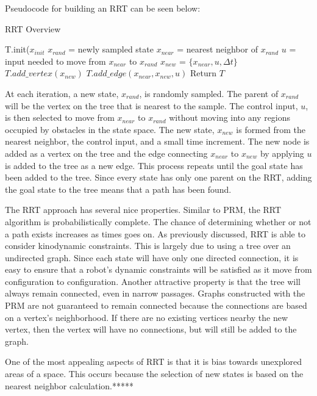 \documentclass[10pt,conference]{ieeeconf}
\begin{document}
Pseudocode for building an RRT can be seen below:

\begin{algorithm}
\caption{RRT Overview}
\begin{algorithmic}[1]
\State T.init($x_{init}$
\State $x_{rand}$ = newly sampled state
\State $x_{near}$ = nearest neighbor of $x_{rand}$
\State $u$ = input needed to move from $x_{near}$ to $x_{rand}$
\State $x_{new}$ = $\{x_{near}, u, \Delta t\}$
\State $T.add\_vertex(x_{new})$
\State $T.add\_edge(x_{near}, x_{new}, u)$
\EndWhile
\State Return $T$
\EndFunction
\end{algorithmic}
\end{algorithm}

At each iteration, a new state, $x_{rand}$, is randomly sampled. The parent of $x_{rand}$ will be the vertex on the tree that is nearest to the sample. The control input, $u$, is then selected to move from $x_{near}$ to $x_{rand}$ without moving into any regions occupied by obstacles in the state space. The new state, $x_{new}$ is formed from the nearest neighbor, the control input, and a small time increment. The new node is added as a vertex on the tree and the edge connecting $x_{near}$ to $x_{new}$ by applying $u$ is added to the tree as a new edge. This process repeats until the goal state has been added to the tree. Since every state has only one parent on the RRT, adding the goal state to the tree means that a path has been found. 

The RRT approach has several nice properties. Similar to PRM, the RRT algorithm is probabilistically complete. The chance of determining whether or not a path exists increases as times goes on. As previously discussed, RRT is able to consider kinodynamic constraints. This is largely due to using a tree over an undirected graph. Since each state will have only one directed connection, it is easy to ensure that a robot's dynamic constraints will be satisfied as it move from configuration to configuration. Another attractive property is that the tree will always remain connected, even in narrow passages. Graphs constructed with the PRM are not guaranteed to remain connected because the connections are based on a vertex's neighborhood. If there are no existing vertices nearby the new vertex, then the vertex will have no connections, but will still be added to the graph.

One of the most appealing aspects of RRT is that it is bias towards unexplored areas of a space. This occurs because the selection of new states is based on the nearest neighbor calculation.*****
\end{document}
